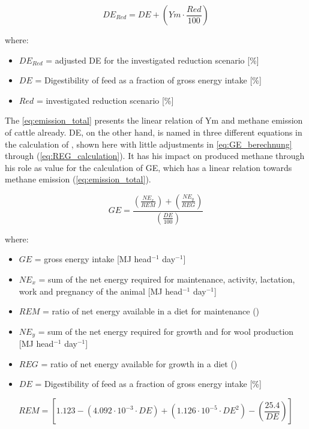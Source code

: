 \begin{equation}
	DE_{Red} = DE + \left( Ym \cdot \frac{Red}{100}\right)
	\label{eq:DE_red_sze_calc}
\end{equation}

\noindent where:
\begin{itemize}
	\item $DE_{Red}$ = adjusted DE for the investigated reduction scenario [\%]
	\item $DE$ = Digestibility of feed as a fraction of gross energy intake [\%] 
	\item $Red$ = investigated reduction scenario [\%]
\end{itemize}

\noindent The \cref{eq:emission_total} presents the linear relation of Ym and methane emission of cattle already. DE, on the other hand, is named in three different equations in the calculation of \citet{IPCC_2019_Chapter_EnterFE}, shown here with little adjustments in \cref{eq:GE_berechnung} through (\ref{eq:REG_calculation}). It has his impact on produced methane through his role as value for the calculation of GE, which has a linear relation towards methane emission (\cref{eq:emission_total}).\clearpage

\begin{equation}
GE = \frac{\left( \frac{NE_x}{REM}\right) +\left( \frac{NE_y}{REG}\right)}{\left( \frac{DE}{100}\right) }
\label{eq:GE_berechnung}
\end{equation}

\noindent where:
\begin{itemize}
	\item $GE$ = gross energy intake [MJ head$^{-1}$ day$^{-1}$]
	\item $NE_x$ = sum of the net energy required for maintenance, activity, lactation, work and pregnancy of the animal [MJ head$^{-1}$ day$^{-1}$]
	\item $REM$ = ratio of net energy available in a diet for maintenance ()
	\item $NE_y$ = sum of the net energy required for growth and for wool production [MJ head$^{-1}$ day$^{-1}$]
	\item $REG$ = ratio of net energy available for growth in a diet ()
	\item $DE$ = Digestibility of feed as a fraction of gross energy intake [\%] 
\end{itemize}

\begin{equation}
REM = \left[1.123 - (4.092 \cdot 10^{-3} \cdot DE) + (1.126\cdot 10^{-5} \cdot DE^{2}) - \left( \frac{25.4}{DE}\right) \right]
\label{eq:REM_calculation}
\end{equation}

